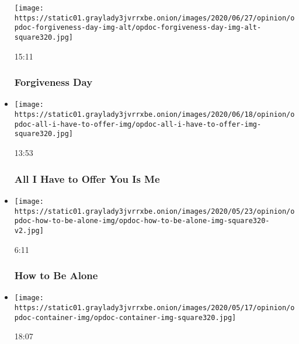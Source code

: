 \begin{itemize}
  \texttt{[image: https://static01.graylady3jvrrxbe.onion/images/2020/06/27/opinion/opdoc-forgiveness-day-img-alt/opdoc-forgiveness-day-img-alt-square320.jpg]}

  15:11

  \hypertarget{forgiveness-day}{%
  \subsubsection{Forgiveness Day}\label{forgiveness-day}}
\item
  \href{https://www.nytimes3xbfgragh.onion/video/opinion/100000007133685/all-i-have-to-offer-you-is-me.html?action=click\&module=video-series-bar\&region=header\&pgtype=Article\&playlistId=video/op-docs}{}

  \texttt{[image: https://static01.graylady3jvrrxbe.onion/images/2020/06/18/opinion/opdoc-all-i-have-to-offer-img/opdoc-all-i-have-to-offer-img-square320.jpg]}

  13:53

  \hypertarget{all-i-have-to-offer-you-is-me}{%
  \subsubsection{All I Have to Offer You Is
  Me}\label{all-i-have-to-offer-you-is-me}}
\item
  \href{https://www.nytimes3xbfgragh.onion/video/opinion/100000007139379/how-to-be-alone.html?action=click\&module=video-series-bar\&region=header\&pgtype=Article\&playlistId=video/op-docs}{}

  \texttt{[image: https://static01.graylady3jvrrxbe.onion/images/2020/05/23/opinion/opdoc-how-to-be-alone-img/opdoc-how-to-be-alone-img-square320-v2.jpg]}

  6:11

  \hypertarget{how-to-be-alone}{%
  \subsubsection{How to Be Alone}\label{how-to-be-alone}}
\item
  \href{https://www.nytimes3xbfgragh.onion/video/opinion/100000006590759/container-greece-migrants.html?action=click\&module=video-series-bar\&region=header\&pgtype=Article\&playlistId=video/op-docs}{}

  \texttt{[image: https://static01.graylady3jvrrxbe.onion/images/2020/05/17/opinion/opdoc-container-img/opdoc-container-img-square320.jpg]}

  18:07


\end{itemize}
